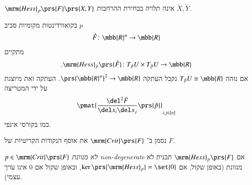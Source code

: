 \documentclass[a4paper,10pt,twoside,openany]{book}
\begin{document}
\begin{corollary}
$\mrm{Hess}_p\prs{F}\prs{X,Y}$
אינה תלויה בבחירת ההרחבות
$\tilde{X}, \tilde{Y}$.
\end{corollary}

\begin{exercise}
בקואורדינטות מקומיות סביב
$p$
\begin{align*}
\hat{F} \colon \mbb{R}^n \to \mbb{R}
\end{align*}
מתקיים
\[\text{.} \mrm{Hess}_{\hat{p}}\prs{\hat{F}} \colon T_{\hat{p}} U \times T_{\hat{p}} U \to \mbb{R}\]
אם נזהה
$T_{\hat{p}}U \cong \mbb{R}$
נקבל העתקה
$\prs{\mbb{R}^n}^2 \to \mbb{R}$.
העתקה זאת מיוצגת על ידי המטריצה
\[\pmat{\frac{\del^2 \hat{F}}{\del x_i \del x_j}\prs{\hat{p}}}_{i,j \in [n]}\]
כמו בקורסי אינפי.
\end{exercise}

\begin{notation}
נסמן ב־%
$\mrm{Crit}\prs{F}$
את אוסף הנקודות הקריטיות של
$F$.
\end{notation}

\begin{definition}
$p \in \mrm{Crit}\prs{F}$
\emph{לא מנוונת
\textenglish{non-degenerate}}
אם
$\mrm{Hess}_p\prs{F}$
תבנית לא מנוונת (באופן שקול, אם
$\ker\prs{\mrm{Hess}_p} = \set{0}$,
ובאופן שקול אם
$0$
אינו ערך עצמי).
\end{definition}
\end{document}
